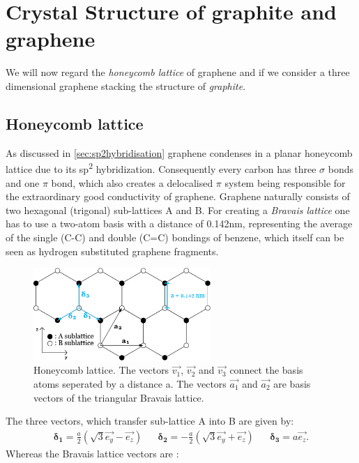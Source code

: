 	
	\section{Crystal Structure of graphite and graphene}
		We will now regard the \textit{honeycomb lattice} of graphene and if we consider a three dimensional graphene stacking the structure of \textit{graphite}.
		
		\subsection{Honeycomb lattice}
			As discussed in \ref{sec:sp2hybridisation} graphene condenses in a planar honeycomb lattice due to its sp\textsuperscript{2} hybridization. Consequently every carbon has three $\sigma$ bonds and one $\pi$ bond, which also creates a delocalised $\pi$ system being responsible for the extraordinary good conductivity of graphene. Graphene naturally consists of two hexagonal (trigonal) sub-lattices A and B. For creating a \textit{Bravais lattice} one has to use a two-atom basis with a distance of 0.142nm, representing the average of the single (C-C) and double (C=C) bondings of benzene, which itself can be seen as hydrogen substituted graphene fragments.		
			\begin{figure}[ht]
				\centering
				\includegraphics[width=0.6\textwidth]{figures/Carbon/grapheneLattice.png}
				\caption{Honeycomb lattice. The vectors $\vec{v_1}$, $\vec{v_2}$ and $\vec{v_3}$ connect the basis atoms seperated by a distance a. The vectors $\vec{a_1}$ and $\vec{a_2}$ are basis vectors of the triangular Bravais lattice.}
				\label{fig:grapheneHoneycomb}
			\end{figure}			
			The three vectors, which transfer sub-lattice A into B are given by:
			\begin{align}
				\label{eq:grapheneDisplacement}
				\boldsymbol{\delta_1} = \frac{a}{2} (\sqrt{3} \vec{e_y} - \vec{e_z}) && \boldsymbol{\delta_2} = - \frac{a}{2} (\sqrt{3} \vec{e_y} + \vec{e_z}) && \boldsymbol{\delta_3} = a \vec{e_z}.
			\end{align}
			Whereas the Bravais lattice vectors are :
